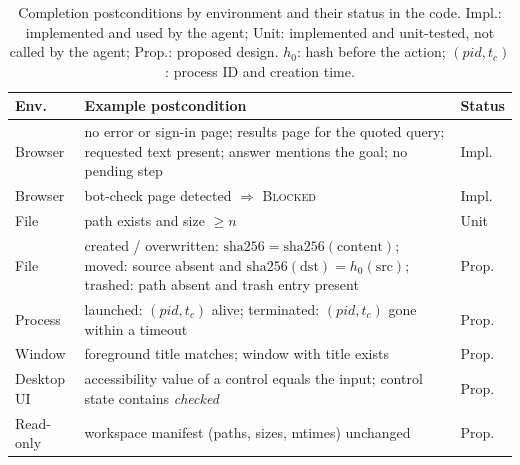 \begin{table}[t]
\centering
\caption{Completion postconditions by environment and their status in the code. Impl.: implemented and used by the agent; Unit: implemented and unit-tested, not called by the agent; Prop.: proposed design. $h_0$: hash before the action; $(\mathit{pid},t_c)$: process ID and creation time.}
\label{tab:post}
\footnotesize
\setlength{\tabcolsep}{2.2pt}
\begin{tabular}{@{}p{1.25cm}p{5.05cm}l@{}}
\toprule
Env. & Example postcondition & Status \\
\midrule
Browser & no error or sign-in page; results page for the quoted query; requested text present; answer mentions the goal; no pending step & Impl. \\
Browser & bot-check page detected $\Rightarrow$ \textsc{Blocked} & Impl. \\
File & path exists and size $\geq n$ & Unit \\
File & created / overwritten: $\mathrm{sha256}=\mathrm{sha256}(\text{content})$; moved: source absent and $\mathrm{sha256}(\text{dst})=h_0(\text{src})$; trashed: path absent and trash entry present & Prop. \\
Process & launched: $(\mathit{pid},t_c)$ alive; terminated: $(\mathit{pid},t_c)$ gone within a timeout & Prop. \\
Window & foreground title matches; window with title exists & Prop. \\
Desktop UI & accessibility value of a control equals the input; control state contains \textit{checked} & Prop. \\
Read-only & workspace manifest (paths, sizes, mtimes) unchanged & Prop. \\
\bottomrule
\end{tabular}
\end{table}
